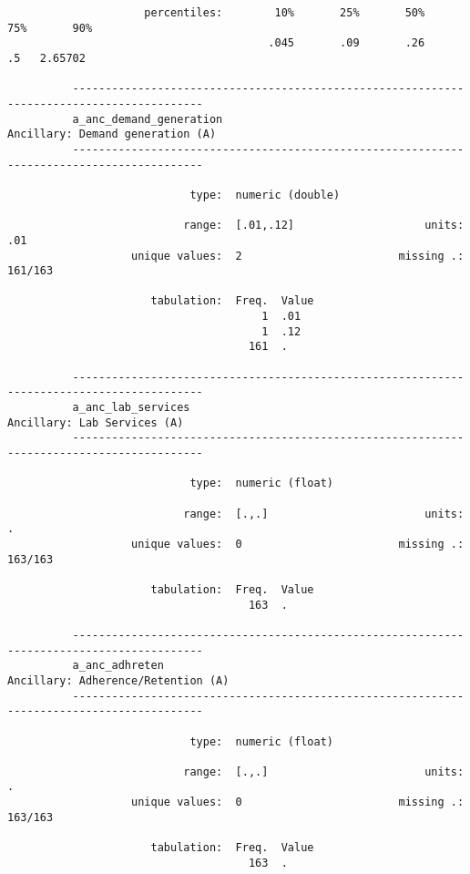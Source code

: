 \documentclass{article}
\begin{document}
\begin{verbatim}
                     percentiles:        10%       25%       50%       75%       90%
                                        .045       .09       .26        .5   2.65702
          
          ------------------------------------------------------------------------------------------
          a_anc_demand_generation                                   Ancillary: Demand generation (A)
          ------------------------------------------------------------------------------------------
          
                            type:  numeric (double)
          
                           range:  [.01,.12]                    units:  .01
                   unique values:  2                        missing .:  161/163
          
                      tabulation:  Freq.  Value
                                       1  .01
                                       1  .12
                                     161  .
          
          ------------------------------------------------------------------------------------------
          a_anc_lab_services                                             Ancillary: Lab Services (A)
          ------------------------------------------------------------------------------------------
          
                            type:  numeric (float)
          
                           range:  [.,.]                        units:  .
                   unique values:  0                        missing .:  163/163
          
                      tabulation:  Freq.  Value
                                     163  .
          
          ------------------------------------------------------------------------------------------
          a_anc_adhreten                                          Ancillary: Adherence/Retention (A)
          ------------------------------------------------------------------------------------------
          
                            type:  numeric (float)
          
                           range:  [.,.]                        units:  .
                   unique values:  0                        missing .:  163/163
          
                      tabulation:  Freq.  Value
                                     163  .
          

\end{verbatim}
\end{document}

